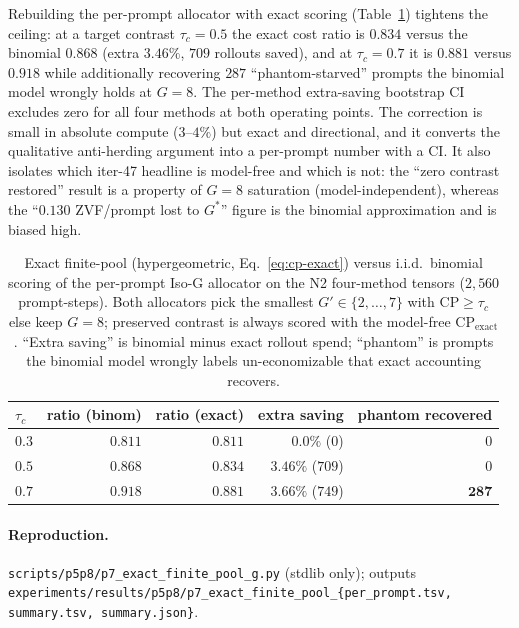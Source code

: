 \documentclass{article}
\begin{document}
Rebuilding the per-prompt allocator with exact scoring
(Table~\ref{tab:p7-exact-finite-pool}) tightens the ceiling: at a target
contrast $\tau_c{=}0.5$ the exact cost ratio is $0.834$ versus the
binomial $0.868$ (extra $3.46\%$, $709$ rollouts saved), and at
$\tau_c{=}0.7$ it is $0.881$ versus $0.918$ while additionally recovering
$287$ ``phantom-starved'' prompts the binomial model wrongly holds at
$G{=}8$. The per-method extra-saving bootstrap CI excludes zero for all
four methods at both operating points. The correction is small in
absolute compute ($3$--$4\%$) but exact and directional, and it converts
the qualitative anti-herding argument into a per-prompt number with a CI.
It also isolates which iter-47 headline is model-free and which is not:
the ``zero contrast restored'' result is a property of $G{=}8$ saturation
(model-independent), whereas the ``$0.130$ ZVF/prompt lost to $G^*$''
figure is the binomial approximation and is biased high.

\begin{table}[t]
\centering
\caption{Exact finite-pool (hypergeometric, Eq.~\eqref{eq:cp-exact})
versus i.i.d.\ binomial scoring of the per-prompt Iso-G allocator on the
N2 four-method tensors ($2{,}560$ prompt-steps). Both allocators pick the
smallest $G'\in\{2,\dots,7\}$ with $\mathrm{CP}\ge\tau_c$ else keep
$G{=}8$; preserved contrast is always scored with the model-free
$\mathrm{CP}_\text{exact}$. ``Extra saving'' is binomial minus exact
rollout spend; ``phantom'' is prompts the binomial model wrongly labels
un-economizable that exact accounting recovers.}
\label{tab:p7-exact-finite-pool}
\begin{tabular}{lrrrr}
\toprule
$\tau_c$ & ratio (binom) & ratio (exact) & extra saving & phantom recovered \\
\midrule
$0.3$ & $0.811$ & $0.811$ & $0.0\%$ ($0$) & $0$ \\
$0.5$ & $0.868$ & $\mathbf{0.834}$ & $\mathbf{3.46\%}$ ($709$) & $0$ \\
$0.7$ & $0.918$ & $\mathbf{0.881}$ & $\mathbf{3.66\%}$ ($749$) & $\mathbf{287}$ \\
\bottomrule
\end{tabular}
\end{table}

\paragraph{Reproduction.}
\texttt{scripts/p5p8/p7\_exact\_finite\_pool\_g.py} (stdlib only); outputs
\texttt{experiments/results/p5p8/p7\_exact\_finite\_pool\_\{per\_prompt.tsv,
summary.tsv, summary.json\}}.
\end{document}
